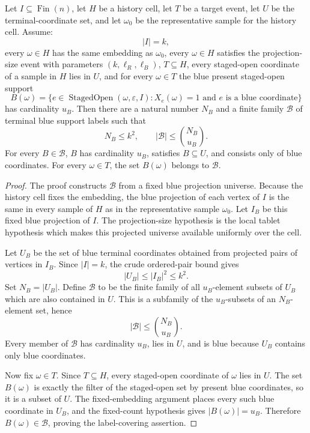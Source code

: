 \begin{helper}
Let \(I\subseteq \operatorname{Fin}(n)\), let \(H\) be a history cell, let
\(T\) be a target event, let \(U\) be the terminal-coordinate set, and let
\(\omega_0\) be the representative sample for the history cell.  Assume:
\[
|I|=k,
\]
every \(\omega\in H\) has the same embedding as \(\omega_0\), every
\(\omega\in H\) satisfies the projection-size event with parameters
\((k,\ell_R,\ell_B)\), \(T\subseteq H\), every staged-open coordinate of a
sample in \(H\) lies in \(U\), and for every \(\omega\in T\) the blue present
staged-open support
\[
B(\omega)=
\{e\in \operatorname{StagedOpen}(\omega,\varepsilon,I):
  X_e(\omega)=1\text{ and }e\text{ is a blue coordinate}\}
\]
has cardinality \(u_B\).  Then there are a natural number \(N_B\) and a
finite family \(\mathcal B\) of terminal blue support labels such that
\[
N_B\le k^2,\qquad |\mathcal B|\le \binom{N_B}{u_B}.
\]
For every \(B\in\mathcal B\), \(B\) has cardinality \(u_B\), satisfies
\(B\subseteq U\), and consists only of blue coordinates.  For every
\(\omega\in T\), the set \(B(\omega)\) belongs to \(\mathcal B\).
\end{helper}
\begin{proof}
The proof constructs \(\mathcal B\) from a fixed blue projection universe.
Because the history cell fixes the embedding, the blue projection of each
vertex of \(I\) is the same in every sample of \(H\) as in the representative
sample \(\omega_0\).  Let \(I_B\) be this fixed blue projection of \(I\).
The projection-size hypothesis is the local tablet hypothesis which makes
this projected universe available uniformly over the cell.

Let \(U_B\) be the set of blue terminal coordinates obtained from projected
pairs of vertices in \(I_B\).  Since \(|I|=k\), the crude ordered-pair bound
gives
\[
|U_B|\le |I_B|^2\le k^2.
\]
Set \(N_B=|U_B|\).  Define \(\mathcal B\) to be the finite family of all
\(u_B\)-element subsets of \(U_B\) which are also contained in \(U\).  This is
a subfamily of the \(u_B\)-subsets of an \(N_B\)-element set, hence
\[
|\mathcal B|\le \binom{N_B}{u_B}.
\]
Every member of \(\mathcal B\) has cardinality \(u_B\), lies in \(U\), and is
blue because \(U_B\) contains only blue coordinates.

Now fix \(\omega\in T\).  Since \(T\subseteq H\), every staged-open coordinate
of \(\omega\) lies in \(U\).  The set \(B(\omega)\) is exactly the filter of
the staged-open set by present blue coordinates, so it is a subset of \(U\).
The fixed-embedding argument places every such blue coordinate in \(U_B\), and
the fixed-count hypothesis gives \(|B(\omega)|=u_B\).  Therefore
\(B(\omega)\in\mathcal B\), proving the label-covering assertion.
\end{proof}
